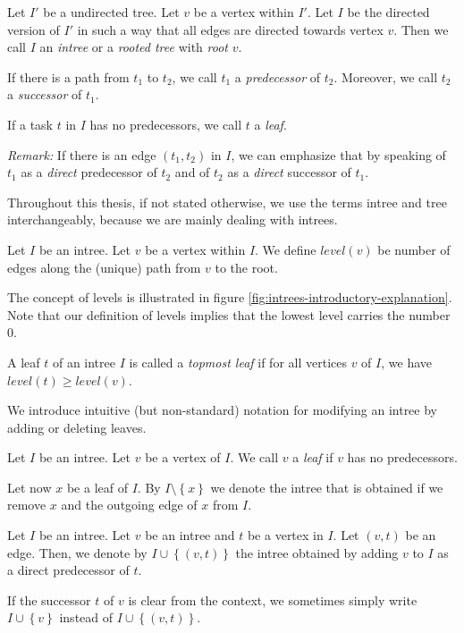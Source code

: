 \begin{definition}[Intree]
  Let $I'$ be a undirected tree. Let $v$ be a vertex within $I'$. Let $I$ be the directed version of $I'$ in such a way that all edges are directed towards vertex $v$. Then we call $I$ an \emph{intree} or a \emph{rooted tree} with \emph{root} $v$.

  If there is a path from $t_1$ to $t_2$, we call $t_1$ a \emph{predecessor} of $t_2$. Moreover, we call $t_2$ a \emph{successor} of $t_1$.

  If a task $t$ in $I$ has no predecessors, we call $t$ a \emph{leaf}.
\end{definition}

\emph{Remark:} If there is an edge $(t_1, t_2)$ in $I$, we can emphasize that by speaking of $t_1$ as a \emph{direct} predecessor of $t_2$ and of $t_2$ as a \emph{direct} successor of $t_1$.

Throughout this thesis, if not stated otherwise, we use the terms intree and tree interchangeably, because we are mainly dealing with intrees.

\begin{definition}[Level]
  Let $I$ be an intree. Let $v$ be a vertex within $I$. We define $level(v)$ be number of edges along the (unique) path from $v$ to the root.
\end{definition}

The concept of levels is illustrated in figure \ref{fig:intrees-introductory-explanation}. Note that our definition of levels implies that the lowest level carries the number 0.

\begin{definition}
  A leaf $t$ of an intree $I$ is called a \emph{topmost leaf} if for all vertices $v$ of $I$, we have $level(t) \geq level(v)$.
\end{definition}

We introduce intuitive (but non-standard) notation for modifying an intree by adding or deleting leaves.

\begin{definition}
  Let $I$ be an intree. Let $v$ be a vertex of $I$. We call $v$ a \emph{leaf} if $v$ has no predecessors.
  
  Let now $x$ be a leaf of $I$.
  By $I\setminus\left\{ x \right\}$ we denote the intree that is obtained if we remove $x$ and the outgoing edge of $x$ from $I$.
\end{definition}

\begin{definition}
  Let $I$ be an intree. Let $v$ be an intree and $t$ be a vertex in $I$. Let $(v,t)$ be an edge. Then, we denote by $I\cup\left\{ (v,t) \right\}$ the intree obtained by adding $v$ to $I$ as a direct predecessor of $t$.

  If the successor $t$ of $v$ is clear from the context, we sometimes simply write $I\cup\left\{ v \right\}$ instead of $I\cup\left\{ (v,t) \right\}$.
\end{definition}

